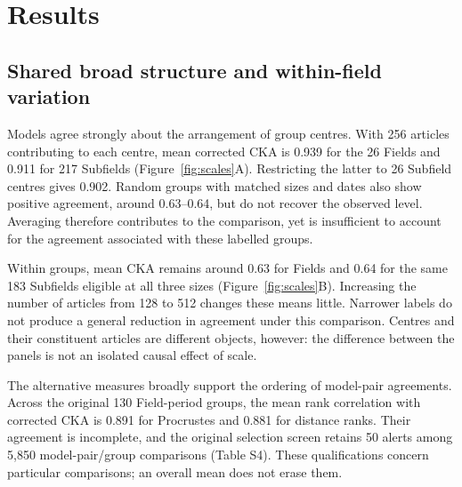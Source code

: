 \documentclass[12pt]{article}
\begin{document}
\section{Results}
\subsection{Shared broad structure and within-field variation}
Models agree strongly about the arrangement of group centres. With 256 articles contributing to each centre, mean corrected CKA is 0.939 for the 26 Fields and 0.911 for 217 Subfields (Figure~\ref{fig:scales}A). Restricting the latter to 26 Subfield centres gives 0.902. Random groups with matched sizes and dates also show positive agreement, around 0.63--0.64, but do not recover the observed level. Averaging therefore contributes to the comparison, yet is insufficient to account for the agreement associated with these labelled groups.

Within groups, mean CKA remains around 0.63 for Fields and 0.64 for the same 183 Subfields eligible at all three sizes (Figure~\ref{fig:scales}B). Increasing the number of articles from 128 to 512 changes these means little. Narrower labels do not produce a general reduction in agreement under this comparison. Centres and their constituent articles are different objects, however: the difference between the panels is not an isolated causal effect of scale.

The alternative measures broadly support the ordering of model-pair agreements. Across the original 130 Field-period groups, the mean rank correlation with corrected CKA is 0.891 for Procrustes and 0.881 for distance ranks. Their agreement is incomplete, and the original selection screen retains 50 alerts among 5,850 model-pair/group comparisons (Table S4). These qualifications concern particular comparisons; an overall mean does not erase them.
\end{document}
